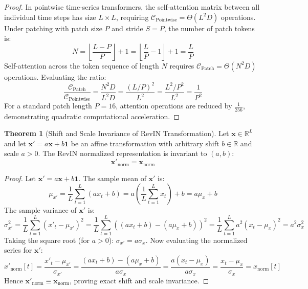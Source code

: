 \documentclass[11pt,a4paper]{article}
\theoremstyle{definition}
\newtheorem{theorem}{\textbf{Theorem}}[section]
\begin{document}
\begin{proof}
In pointwise time-series transformers, the self-attention matrix between all individual time steps has size $L \times L$, requiring $\mathcal{C}_{\text{Pointwise}} = \Theta(L^2 D)$ operations.
Under patching with patch size $P$ and stride $S = P$, the number of patch tokens is:
{\boldmath
\begin{equation}
N = \left\lfloor \frac{L - P}{P} \right\rfloor + 1 = \left\lfloor \frac{L}{P} - 1 \right\rfloor + 1 = \frac{L}{P}
\end{equation}
}
Self-attention across the token sequence of length $N$ requires $\mathcal{C}_{\text{Patch}} = \Theta(N^2 D)$ operations.
Evaluating the ratio:
{\boldmath
\begin{equation}
\frac{\mathcal{C}_{\text{Patch}}}{\mathcal{C}_{\text{Pointwise}}} = \frac{N^2 D}{L^2 D} = \frac{(L / P)^2}{L^2} = \frac{L^2 / P^2}{L^2} = \frac{1}{P^2}
\end{equation}
}
For a standard patch length $P = 16$, attention operations are reduced by $\frac{1}{256}$, demonstrating quadratic computational acceleration.
\end{proof}

\begin{theorem}[Shift and Scale Invariance of RevIN Transformation]
Let $\mathbf{x} \in \mathbb{R}^L$ and let $\mathbf{x}' = a \mathbf{x} + b \mathbf{1}$ be an affine transformation with arbitrary shift $b \in \mathbb{R}$ and scale $a > 0$. The RevIN normalized representation is invariant to $(a, b)$:
{\boldmath
\begin{equation}
\mathbf{x}'_{\text{norm}} = \mathbf{x}_{\text{norm}}
\end{equation}
}
\end{theorem}

\begin{proof}
Let $\mathbf{x}' = a \mathbf{x} + b \mathbf{1}$. The sample mean of $\mathbf{x}'$ is:
{\boldmath
\begin{equation}
\mu_{x'} = \frac{1}{L}\sum_{t=1}^L (a x_t + b) = a \left( \frac{1}{L}\sum_{t=1}^L x_t \right) + b = a \mu_x + b
\end{equation}
}
The sample variance of $\mathbf{x}'$ is:
{\boldmath
\begin{equation}
\sigma_{x'}^2 = \frac{1}{L}\sum_{t=1}^L (x'_t - \mu_{x'})^2 = \frac{1}{L}\sum_{t=1}^L \left( (a x_t + b) - (a \mu_x + b) \right)^2 = \frac{1}{L}\sum_{t=1}^L a^2 (x_t - \mu_x)^2 = a^2 \sigma_x^2
\end{equation}
}
Taking the square root (for $a > 0$): $\sigma_{x'} = a \sigma_x$.
Now evaluating the normalized series for $\mathbf{x}'$:
{\boldmath
\begin{equation}
x'_{\text{norm}}[t] = \frac{x'_t - \mu_{x'}}{\sigma_{x'}} = \frac{(a x_t + b) - (a \mu_x + b)}{a \sigma_x} = \frac{a (x_t - \mu_x)}{a \sigma_x} = \frac{x_t - \mu_x}{\sigma_x} = x_{\text{norm}}[t]
\end{equation}
}
Hence $\mathbf{x}'_{\text{norm}} \equiv \mathbf{x}_{\text{norm}}$, proving exact shift and scale invariance.
\end{proof}
\end{document}
